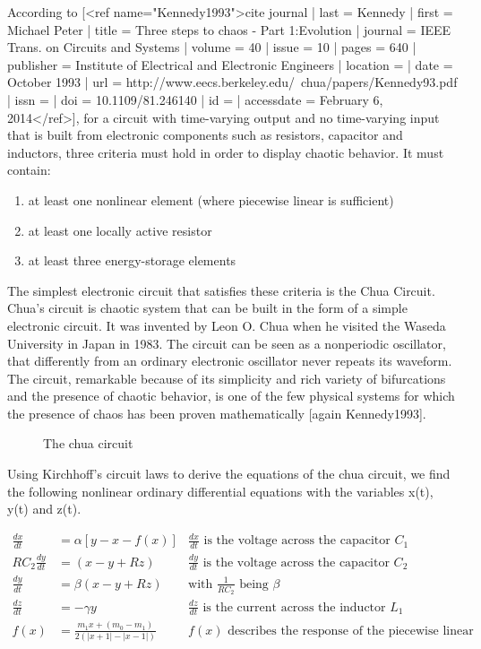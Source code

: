 \documentclass[main]{subfiles}
\begin{document}
According to [<ref name="Kennedy1993">{{cite journal
  | last = Kennedy
  | first = Michael Peter
  | title = Three steps to chaos - Part 1:Evolution
  | journal = IEEE Trans. on Circuits and Systems
  | volume = 40
  | issue = 10
  | pages = 640
  | publisher = Institute of Electrical and Electronic Engineers 
  | location = 
  | date = October 1993
  | url = http://www.eecs.berkeley.edu/~chua/papers/Kennedy93.pdf
  | issn = 
  | doi = 10.1109/81.246140
  | id = 
  | accessdate = February 6, 2014}}</ref>], for a circuit with time-varying output and no time-varying input that is built from electronic components such as resistors, capacitor and inductors, three criteria must hold in order to display chaotic behavior. It must contain:
  \begin{enumerate}
  \item at least one nonlinear element (where piecewise linear is sufficient)
  \item at least one locally active resistor
  \item at least three energy-storage elements
  \end{enumerate}
  
The simplest electronic circuit that satisfies these criteria is the Chua Circuit. Chua's circuit is chaotic system that can be built in the form of a simple electronic circuit. It was invented by Leon O. Chua when he visited the Waseda University in Japan in 1983. The circuit can be seen as a nonperiodic oscillator, that differently from an ordinary electronic oscillator never repeats its waveform. The circuit, remarkable because of its simplicity and rich variety of bifurcations and the presence of chaotic behavior, is one of the few physical systems for which the presence of chaos has been proven mathematically [again Kennedy1993].

\begin{figure}[!h]
\centering
{}
\caption[The chua circuit]{The chua circuit}
\label{figure:chuacircuit}
\end{figure}

Using Kirchhoff's circuit laws to derive the equations of the chua circuit, we find the following nonlinear ordinary differential equations with the variables x(t), y(t) and z(t).

\begin{align*}
\frac{dx}{dt}&=\alpha [y-x-f(x)] &\frac{dx}{dt}\text{ is the voltage across the capacitor }C_1\\
RC_2\frac{dy}{dt}&= (x-y+Rz) &\frac{dy}{dt}\text{ is the voltage across the capacitor }C_2\\
\frac{dy}{dt}&=\beta (x-y+Rz) &\text{with } \frac{1}{RC_2} \text{ being }\beta\\
\frac{dz}{dt}&=-\gamma y &\frac{dz}{dt}\text{ is the current across the inductor }L_1\\
f (x) &= \frac{m_1 x + (m_0 - m_1)}{2 (| x + 1 | -| x - 1 |)} &f(x)\text{ describes the response of the piecewise linear resistor}
\end{align*}
\end{document}
